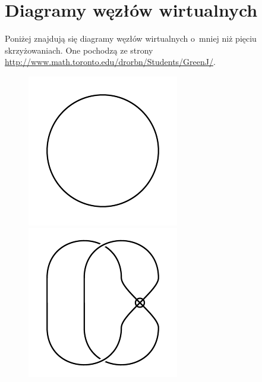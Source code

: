 
\section{Diagramy węzłów wirtualnych}
Poniżej znajdują się diagramy węzłów wirtualnych o~mniej niż pięciu skrzyżowaniach.
One pochodzą ze strony \url{http://www.math.toronto.edu/drorbn/Students/GreenJ/}.

\begin{figure}[H]
\begin{minipage}[b]{.18\linewidth}
\centering
\includegraphics[width=\linewidth]{../data/virtual_0_1.png}
\end{minipage}
\begin{minipage}[b]{.18\linewidth}
\centering
\includegraphics[width=\linewidth]{../data/virtual_2_1.png}

\end{minipage}
\end{figure}
